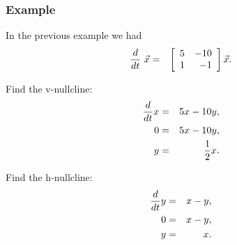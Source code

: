 \begin{frame}
  \frametitle{Example}
  
  In the previous example we had
  \begin{eqnarray*}
    \deriv{~}{t} \vec{x} & = & \arrayTwo{5}{-10}{1}{-1} \vec{x}.
  \end{eqnarray*}

  {
    Find the v-nullcline:
    \begin{eqnarray*}
      \deriv{x}{t} & = & 5x - 10y, \\
      0 & = & 5x - 10y, \\
      y & = & \frac{1}{2} x.
    \end{eqnarray*}
  }

  {
    Find the h-nullcline:
    \begin{eqnarray*}
      \deriv{y}{t} & = & x - y, \\
      0 & = & x - y, \\
      y & = &  x.
    \end{eqnarray*}
  }


\end{frame}



